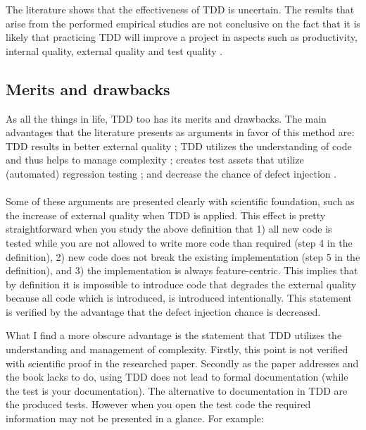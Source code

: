 The literature shows that the effectiveness of TDD is uncertain.
The results that arise from the performed empirical studies are not conclusive on the fact that it is likely that practicing TDD will improve a project in aspects such as
productivity, internal quality, external quality and test quality \autocite{SAC-J-2003-GeorgeW04} \autocite{MAKING_SOFTWARE}.

\subsection*{Merits and drawbacks}

As all the things in life, TDD too has its merits and drawbacks.
The main advantages that the literature presents as arguments in favor of this method are:
TDD results in better external quality \autocite[340]{SAC-J-2003-GeorgeW04} \autocite[212]{MAKING_SOFTWARE};
TDD utilizes the understanding of code and thus helps to manage complexity \autocite[338]{SAC-J-2003-GeorgeW04};
creates test assets that utilize (automated) regression testing \autocite[338]{SAC-J-2003-GeorgeW04} \autocite[208]{MAKING_SOFTWARE};
and decrease the chance of defect injection \autocite[338]{SAC-J-2003-GeorgeW04}.

\paragraph{}
Some of these arguments are presented clearly with scientific foundation, such as the increase of external quality when TDD is applied.
This effect is pretty straightforward when you study the above definition that
1) all new code is tested while you are not allowed to write more code than required (step 4 in the definition),
2) new code does not break the existing implementation (step 5 in the definition),
and 3) the implementation is always feature-centric.
This implies that by definition it is impossible to introduce code that degrades the external quality because all code which is introduced, is introduced intentionally.
This statement is verified by the advantage that the defect injection chance is decreased.

What I find a more obscure advantage is the statement that TDD utilizes the understanding and management of complexity.
Firstly, this point is not verified with scientific proof in the researched paper.
Secondly as the paper \autocite[338]{SAC-J-2003-GeorgeW04} addresses and the book lacks to do, using TDD does not lead to formal documentation (while the test is your documentation).
The alternative to documentation in TDD are the produced tests.
However when you open the test code the required information may not be presented in a glance.
For example: \\

